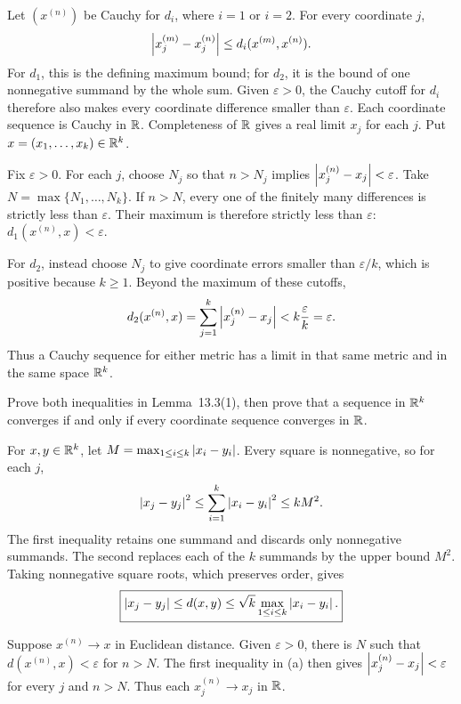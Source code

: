 Let $(x^{(n)})$ be Cauchy for $d_i$, where $i=1$ or $i=2$.
For every coordinate $j$,
\[
 \left|x_j^{(m)}-x_j^{(n)}\right|\le d_i(x^{(m)},x^{(n)}).
\]
For $d_1$, this is the defining maximum bound; for $d_2$, it is
the bound of one nonnegative summand by the whole sum. Given
$\varepsilon>0$, the Cauchy cutoff for $d_i$ therefore also
makes every coordinate difference smaller than $\varepsilon$.
Each coordinate sequence is Cauchy in $\mathbb{R}$. Completeness of
$\mathbb{R}$ gives a real limit $x_j$ for each $j$. Put
$x=(x_1,\ldots,x_k)\in\mathbb{R}^k$.

Fix $\varepsilon>0$. For each $j$, choose $N_j$ so that
$n>N_j$ implies $\left|x_j^{(n)}-x_j\right|<\varepsilon$.
Take $N=\max\{N_1,\ldots,N_k\}$. If $n>N$, every one of
the finitely many differences is strictly less than $\varepsilon$.
Their maximum is therefore strictly less than $\varepsilon$:
$d_1(x^{(n)},x)<\varepsilon$.

For $d_2$, instead choose $N_j$ to give coordinate errors smaller
than $\varepsilon/k$, which is positive because $k\ge1$.
Beyond the maximum of these cutoffs,
\[
 d_2(x^{(n)},x)=\sum_{j=1}^k\left|x_j^{(n)}-x_j\right|
 <k\frac{\varepsilon}{k}=\varepsilon.
\]
Thus a Cauchy sequence for either metric has a limit in that same
metric and in the same space $\mathbb{R}^k$.

\goal Prove both inequalities in Lemma~13.3(1), then prove that
a sequence in $\mathbb{R}^k$ converges if and only if every coordinate
sequence converges in $\mathbb{R}$.

For $x,y\in\mathbb{R}^k$, let
$M=\max_{1\le i\le k}\left|x_i-y_i\right|$. Every square is
nonnegative, so for each $j$,
\[
 \left|x_j-y_j\right|^2\le\sum_{i=1}^k\left|x_i-y_i\right|^2\le kM^2.
\]
The first inequality retains one summand and discards only
nonnegative summands. The second replaces each of the $k$
summands by the upper bound $M^2$. Taking nonnegative square
roots, which preserves order, gives
\[
 \boxed{\left|x_j-y_j\right|\le d(x,y)\le
 \sqrt{k}\max_{1\le i\le k}\left|x_i-y_i\right|.}
\]

Suppose $x^{(n)}\to x$ in Euclidean distance. Given
$\varepsilon>0$, there is $N$ such that
$d(x^{(n)},x)<\varepsilon$ for $n>N$. The first inequality
in (a) then gives
$\left|x_j^{(n)}-x_j\right|<\varepsilon$ for every $j$ and $n>N$.
Thus each $x_j^{(n)}\to x_j$ in $\mathbb{R}$.

